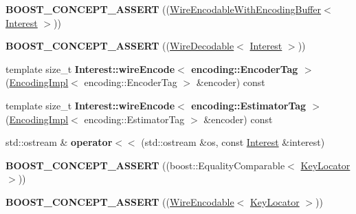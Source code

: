 \begin{DoxyCompactItemize}
\item 
{\bfseries B\+O\+O\+S\+T\+\_\+\+C\+O\+N\+C\+E\+P\+T\+\_\+\+A\+S\+S\+E\+RT} ((\hyperlink{classndn_1_1WireEncodableWithEncodingBuffer}{Wire\+Encodable\+With\+Encoding\+Buffer}$<$ \hyperlink{classndn_1_1Interest}{Interest} $>$))\hypertarget{namespacendn_a74c20a40ea62d424b22afe14b53ad5fd}{}\label{namespacendn_a74c20a40ea62d424b22afe14b53ad5fd}

\item 
{\bfseries B\+O\+O\+S\+T\+\_\+\+C\+O\+N\+C\+E\+P\+T\+\_\+\+A\+S\+S\+E\+RT} ((\hyperlink{classndn_1_1WireDecodable}{Wire\+Decodable}$<$ \hyperlink{classndn_1_1Interest}{Interest} $>$))\hypertarget{namespacendn_ae67cded364f97d03dd68ee3bb7c1c80b}{}\label{namespacendn_ae67cded364f97d03dd68ee3bb7c1c80b}

\item 
template size\+\_\+t {\bfseries Interest\+::wire\+Encode$<$ encoding\+::\+Encoder\+Tag $>$} (\hyperlink{classndn_1_1encoding_1_1EncodingImpl}{Encoding\+Impl}$<$ encoding\+::\+Encoder\+Tag $>$ \&encoder) const\hypertarget{namespacendn_aa0097f43785678a22bd8627ad38f1186}{}\label{namespacendn_aa0097f43785678a22bd8627ad38f1186}

\item 
template size\+\_\+t {\bfseries Interest\+::wire\+Encode$<$ encoding\+::\+Estimator\+Tag $>$} (\hyperlink{classndn_1_1encoding_1_1EncodingImpl}{Encoding\+Impl}$<$ encoding\+::\+Estimator\+Tag $>$ \&encoder) const\hypertarget{namespacendn_a1a26c1ee35fc314d0d99c35c91ea5645}{}\label{namespacendn_a1a26c1ee35fc314d0d99c35c91ea5645}

\item 
std\+::ostream \& {\bfseries operator$<$$<$} (std\+::ostream \&os, const \hyperlink{classndn_1_1Interest}{Interest} \&interest)\hypertarget{namespacendn_aab00284c5da5e72ff311c2edb646203b}{}\label{namespacendn_aab00284c5da5e72ff311c2edb646203b}

\item 
{\bfseries B\+O\+O\+S\+T\+\_\+\+C\+O\+N\+C\+E\+P\+T\+\_\+\+A\+S\+S\+E\+RT} ((boost\+::\+Equality\+Comparable$<$ \hyperlink{classndn_1_1KeyLocator}{Key\+Locator} $>$))\hypertarget{namespacendn_adadafde544dac4b7d990b15e0c2fbe14}{}\label{namespacendn_adadafde544dac4b7d990b15e0c2fbe14}

\item 
{\bfseries B\+O\+O\+S\+T\+\_\+\+C\+O\+N\+C\+E\+P\+T\+\_\+\+A\+S\+S\+E\+RT} ((\hyperlink{classndn_1_1WireEncodable}{Wire\+Encodable}$<$ \hyperlink{classndn_1_1KeyLocator}{Key\+Locator} $>$))\hypertarget{namespacendn_a4ef7cc92fd13ed8fe147be0db618dfee}{}\label{namespacendn_a4ef7cc92fd13ed8fe147be0db618dfee}


\end{DoxyCompactItemize}
